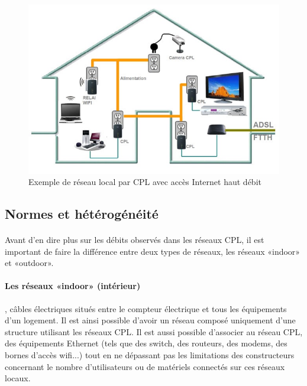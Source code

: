     \begin{figure}[h]
        \begin{center}
            \includegraphics[scale=0.5]{./images/cpl/exempleReseauLocalCPL.jpg}
        \end{center}
            \caption{ Exemple de réseau local par CPL avec accès Internet haut débit }
            \label{Exemple liens actuels avec CPL}
    \end{figure}

        \subsection{Normes et hétérogénéité}
            \paragraph{}
Avant d’en dire plus sur les débits observés dans les réseaux CPL, il est important de faire la différence entre deux types de réseaux,
les réseaux «indoor» et «outdoor».
            \paragraph{Les réseaux «indoor» (intérieur)}
, câbles électriques situés entre le compteur électrique et tous les équipements d’un logement.
Il est ainsi possible d'avoir un réseau composé uniquement d'une structure utilisant les réseaux CPL.
Il est aussi possible d'associer au réseau CPL, des équipements Ethernet (tels que des switch, des routeurs, des modems, des bornes d'accès wifi...)
tout en ne dépassant pas les limitations des constructeurs concernant le nombre d'utilisateurs ou de matériels connectés sur ces réseaux locaux.
